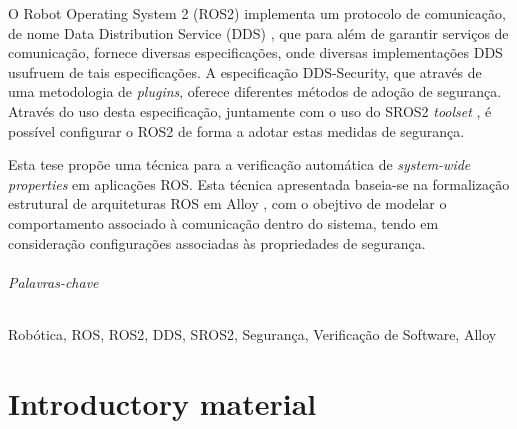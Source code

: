 \documentclass[
  oneside,
  11pt, a4paper,
  footinclude=true,
  headinclude=true,
  cleardoublepage=empty
]{scrbook}
\begin{document}
	O Robot Operating System 2 (ROS2) implementa um protocolo de comunicação, de nome Data Distribution Service (DDS) \cite{3}, que para além de garantir serviços de comunicação, fornece diversas especificações, onde diversas implementações DDS usufruem de tais especificações. A especificação DDS-Security, que através de uma metodologia de \textit{plugins}, oferece diferentes métodos de adoção de segurança. Através do uso desta especificação, juntamente com o uso do SROS2 \textit{toolset} \cite{ros-dds-integration}, é possível configurar o ROS2 de forma a adotar estas medidas de segurança.

	Esta tese propõe uma técnica para a verificação automática de \textit{system-wide properties} em aplicações ROS. Esta técnica apresentada baseia-se na formalização estrutural de arquiteturas ROS em Alloy \cite{alloy-6}, com o obejtivo de modelar o comportamento associado à comunicação dentro do sistema, tendo em consideração configurações associadas às propriedades de segurança. 
	
	
\paragraph{Palavras-chave} Robótica, ROS, ROS2, DDS, SROS2, Segurança, Verificação de Software, Alloy


	\cleardoublepage

	\setcounter{page}{3}

	\cleardoublepage
	\tableofcontents

	\cleardoublepage
	\listoffigures



	\cleardoublepage
	\setcounter{page}{3}

\part{Introductory material}









%

%
\end{document}
